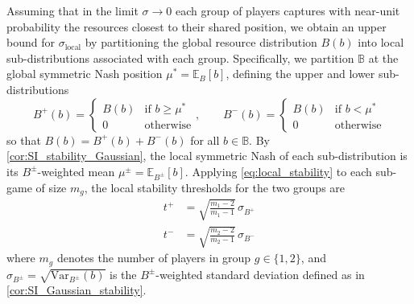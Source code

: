 \documentclass{article}
\begin{document}
                Assuming that in the limit $\sigma \to 0$ each group of players captures with near-unit probability the resources closest to their shared position, we obtain an upper bound for $\sigma_{\mathrm{local}}$ by partitioning the global resource distribution $B(b)$ into local sub-distributions associated with each group. Specifically, we partition $\mathbb{B}$ at the global symmetric Nash position $\mu^* = \mathbb{E}_B[b]$, defining the upper and lower sub-distributions
                \begin{equation}
                    B^+(b) = \begin{cases} B(b) & \text{if } b \geq \mu^* \\ 0 & \text{otherwise} 
                    \end{cases}, 
                    \qquad
                    B^-(b) = \begin{cases} B(b) & \text{if } b < \mu^* \\ 0 & \text{otherwise} 
                    \end{cases}
                \end{equation}
                so that $B(b) = B^+(b) + B^-(b)$ for all $b \in \mathbb{B}$. By \cref{cor:SI_stability_Gaussian}, the local symmetric Nash of each sub-distribution is its $B^\pm$-weighted mean $\mu^\pm = \mathbb{E}_{B^\pm}[b]$. Applying \cref{eq:local_stability} to each sub-game of size $m_g$, the local stability thresholds for the two groups are
                \begin{align}
                    t^+ &= \sqrt{\frac{m_1 - 2}{m_1 - 1}}\,\sigma_{B^+} \label{eq:t_plus}\\
                    t^- &= \sqrt{\frac{m_2 - 2}{m_2 - 1}}\,\sigma_{B^-} \label{eq:t_minus}
                \end{align}
                where $m_g$ denotes the number of players in group $g \in \{1, 2\}$, and $\sigma_{B^\pm} = \sqrt{\mathrm{Var}_{B^\pm}(b)}$ is the $B^\pm$-weighted standard deviation defined as in \cref{cor:SI_Gaussian_stability}.
\end{document}

